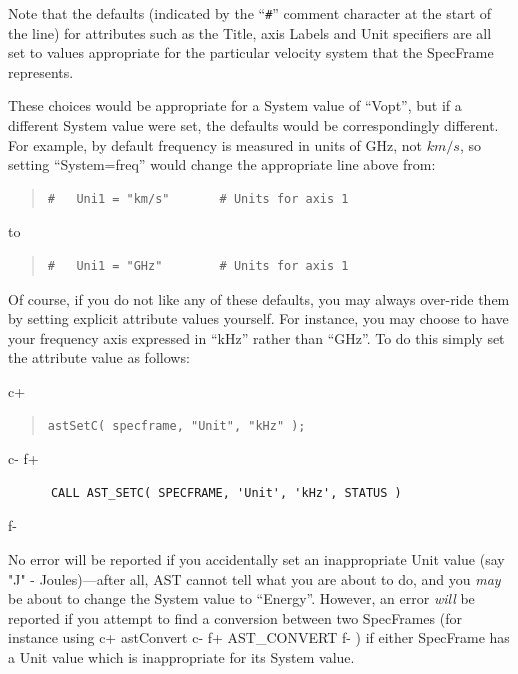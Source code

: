 \documentclass[twoside,11pt]{article}
\begin{document}
Note that the defaults (indicated by the ``\verb?#?'' comment
character at the start of the line) for attributes such as the Title,
axis Labels and Unit specifiers are all set to values appropriate
for the particular velocity system that the SpecFrame represents.

These choices would be appropriate for a System value of ``Vopt'',
but if a different System value were set, the defaults would be
correspondingly different. For example, by default frequency is measured in 
units of GHz, not $km/s$, so setting ``System=freq''
would change the appropriate line above from:

\begin{quote}
\begin{verbatim}
#   Uni1 = "km/s"       # Units for axis 1
\end{verbatim}
\end{quote}

to

\begin{quote}
\begin{verbatim}
#   Uni1 = "GHz"        # Units for axis 1
\end{verbatim}
\end{quote}

Of course, if you do not like any of these defaults, you may always
over-ride them by setting explicit attribute values yourself. For
instance, you may choose to have your frequency axis expressed in ``kHz''
rather than ``GHz''. To do this simply set the attribute value as follows:

c+
\begin{quote}
\small
\begin{verbatim}
astSetC( specframe, "Unit", "kHz" );
\end{verbatim}
\normalsize
\end{quote}
c-
f+
\small
\begin{verbatim}
      CALL AST_SETC( SPECFRAME, 'Unit', 'kHz', STATUS )
\end{verbatim}
\normalsize
f-

No error will be reported if you accidentally set an inappropriate Unit value 
(say "J" - Joules)---after all, AST cannot tell what you are about to do,
and you \emph{may} be about to change the System value to ``Energy''.
However, an error \emph{will} be reported if you attempt to find a
conversion between two SpecFrames (for instance using 
c+
astConvert
c-
f+
AST\_CONVERT
f-
) if either SpecFrame has a Unit value which is inappropriate for its
System value.
\end{document}
